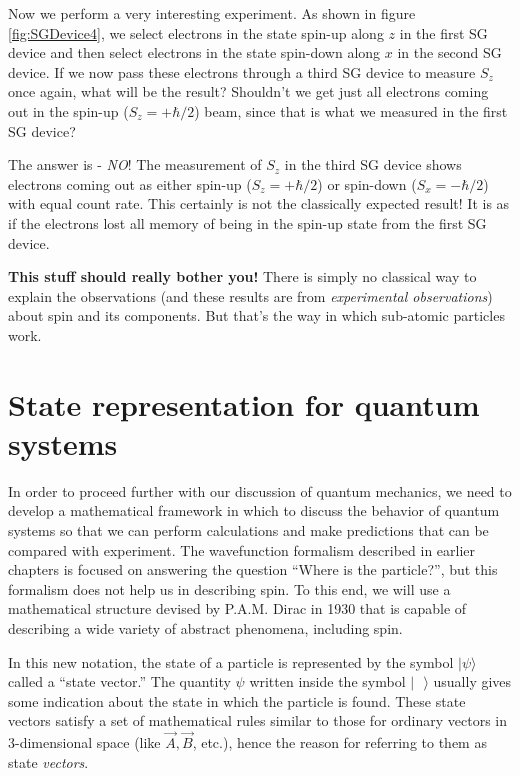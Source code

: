 Now we perform a very interesting experiment.  As shown in figure \ref{fig:SGDevice4}, we select electrons in the state spin-up along $z$ in the first SG device and then select electrons in the state spin-down along $x$ in the second SG device.  If we now pass these electrons through a third SG device to measure $S_z$ once again, what will be the result?  Shouldn't we get just all electrons coming out in the spin-up ($S_z = +\hbar/2$) beam, since that is what we measured in the first SG device?

The answer is - {\it NO\/}!  The measurement of $S_z$ in the third SG device shows electrons coming out as either spin-up ($S_z = +\hbar/2$) or spin-down ($S_x = -\hbar/2$) with equal count rate.  This certainly is not the classically expected result!  It is as if the electrons lost all memory of being in the spin-up state from the first SG device.

{\bf This stuff should really bother you!}  There is simply no
classical way to explain the observations (and these results are
from {\it experimental observations\/}) about spin and its
components.  But that's the way in which sub-atomic particles
work.

\section{State representation for quantum systems}

In order to proceed further with our discussion of quantum mechanics, we need to develop a mathematical framework in which to discuss the behavior of quantum systems so that we can perform calculations and make predictions that can be compared with experiment.  The wavefunction formalism described in earlier chapters is focused on answering the question ``Where is the particle?'', but this formalism does not help us in describing spin.  To this end, we will use a mathematical structure devised by P.A.M. Dirac in 1930 that is capable of describing a wide variety of abstract phenomena, including spin.

In this new notation, the state of a particle is represented by the symbol $|\mbox{$\psi$}\rangle$ called a ``state vector.''  The quantity $\psi$ written inside the symbol $|\mbox{\ \ }\rangle$ usually gives some indication about the state in which the particle is found.  These state vectors satisfy a set of mathematical rules similar to those for ordinary vectors in 3-dimensional space (like $\vec{A}, \vec{B}$, etc.), hence the reason for referring to them as state {\em vectors}.

